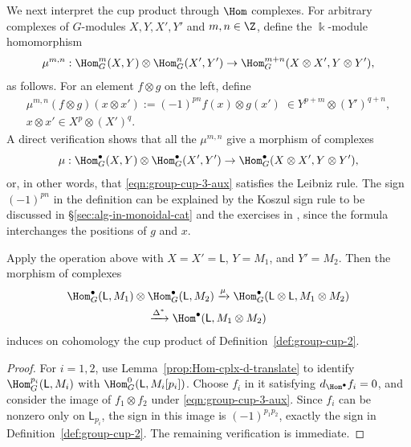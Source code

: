 We next interpret the cup product through $\Hom$ complexes. For arbitrary
complexes of $G$-modules $X,Y,X',Y'$ and $m,n\in\Z$, define the
$\Bbbk$-module homomorphism
\begin{equation}\label{eqn:group-cup-3-aux}
	\mu^{m, n}: \Hom_G^m(X, Y) \otimes \Hom_G^n(X', Y') \to \Hom_G^{m+n}(X \otimes X', Y \otimes Y'),
\end{equation}
as follows. For an element $f\otimes g$ on the left, define
\begin{gather*}
	\mu^{m, n}(f \otimes g)(x \otimes x') := (-1)^{pn} f(x) \otimes g(x') \; \in Y^{p+m} \otimes (Y')^{q+n}, \\
	x \otimes x' \in X^p \otimes (X')^q .
\end{gather*}
A direct verification shows that all the $\mu^{m,n}$ give a morphism of
complexes
\[ \mu: \Hom_G^\bullet(X, Y) \otimes \Hom_G^\bullet(X', Y') \to \Hom_G^\bullet(X \otimes X', Y \otimes Y'), \]
or, in other words, that \eqref{eqn:group-cup-3-aux} satisfies the Leibniz
rule. The sign $(-1)^{pn}$ in the definition can be explained by the Koszul
sign rule to be discussed in \S\ref{sec:alg-in-monoidal-cat} and the
exercises in , since the formula interchanges the positions
of $g$ and $x$.

\begin{lemma}\label{prop:std-cplx-cup-aux}
	Apply the operation above with $X=X'=\mathsf{L}$, $Y=M_1$, and $Y'=M_2$.
	Then the morphism of complexes
	\begin{multline}\label{eqn:group-cup-3-aux1}
		\Hom^\bullet_G(\mathsf{L}, M_1) \otimes \Hom^\bullet_G(\mathsf{L}, M_2) \xrightarrow{\mu} \Hom^\bullet_G(\mathsf{L} \otimes \mathsf{L}, M_1 \otimes M_2) \\
		\xrightarrow{\Delta^*} \Hom^\bullet(\mathsf{L}, M_1 \otimes M_2)
	\end{multline}
	induces on cohomology the cup product of
	Definition~\ref{def:group-cup-2}.
\end{lemma}

\begin{proof}
	For $i=1,2$, use Lemma~\ref{prop:Hom-cplx-d-translate} to identify
	$\Hom_G^{p_i}(\mathsf{L},M_i)$ with
	$\Hom_G^0(\mathsf{L},M_i[p_i])$. Choose $f_i$ in it satisfying
	$d_{\Hom^\bullet}f_i=0$, and consider the image of $f_1\otimes f_2$ under
\eqref{eqn:group-cup-3-aux}. Since $f_i$ can be nonzero only on
$\mathsf{L}_{p_i}$, the sign in this image is $(-1)^{p_1p_2}$, exactly the
sign in Definition~\ref{def:group-cup-2}. The remaining verification is
immediate.
\end{proof}

